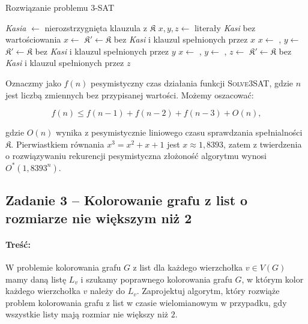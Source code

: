 \begin{algorithm}[H]
	\caption{Rozwiązanie problemu 3-SAT}
	\begin{algorithmic}[1]
		\State \Return \true
		\EndIf
		
		\State 
		\State \textit{Kasia} $\gets$ nierozstrzygnięta klauzula z $\mathfrak{K}$ 
		\State \Return \false
		\EndIf
		\State $x, y, z \gets $ literały \textit{Kasi} bez wartościowania
		\State
		\State $x \gets $ \true
		\State $\mathfrak{K}' \gets \mathfrak{K}$ bez \textit{Kasi} i klauzul spełnionych przez $x$
		\State \Return \true
		\EndIf
		\State
		\State $x \gets $ \false, $y \gets $ \true {}
		\State $\mathfrak{K}' \gets \mathfrak{K}$ bez \textit{Kasi} i klauzul spełnionych przez $y$
		\State \Return \true
		\EndIf
		\State
		\State $x \gets $ \false, $y \gets $ \false, $z \gets $ \true {}
		\State $\mathfrak{K}' \gets \mathfrak{K}$ bez \textit{Kasi} i klauzul spełnionych przez $z$
		\State \Return \true
		\EndIf
		\EndProcedure
	\end{algorithmic}
\end{algorithm}

Oznaczmy jako $f(n)$ pesymistyczny czas działania funkcji \textsc{Solve3SAT}, gdzie $n$ jest liczbą zmiennych bez przypisanej wartości. Możemy oszacować:

\[
f(n) \leq f(n-1) + f(n-2) + f(n-3) + O(n),
\]

gdzie $O(n)$ wynika z pesymistycznie liniowego czasu sprawdzania spełnialności $\mathfrak{K}$. Pierwiastkiem równania
$x^3 = x^2 + x + 1$
jest $x \approx 1{,}8393$, zatem z twierdzenia o rozwiązywaniu rekurencji pesymistyczna złożoność algorytmu wynosi $O^*(1{,}8393^n)$.

\subsection{Zadanie 3 -- Kolorowanie grafu z list o rozmiarze nie większym niż 2}
\paragraph{Treść:} W problemie kolorowania grafu $G$ z list dla każdego wierzchołka 
$v \in V(G)$ mamy daną listę $L_v$ i
szukamy poprawnego kolorowania grafu $G$, w którym kolor każdego wierzchołka $v$ należy do $L_v$.
Zaprojektuj algorytm, który rozwiąże problem kolorowania grafu z list w czasie wielomianowym w przypadku, gdy
wszystkie listy mają rozmiar nie większy niż $2$.

